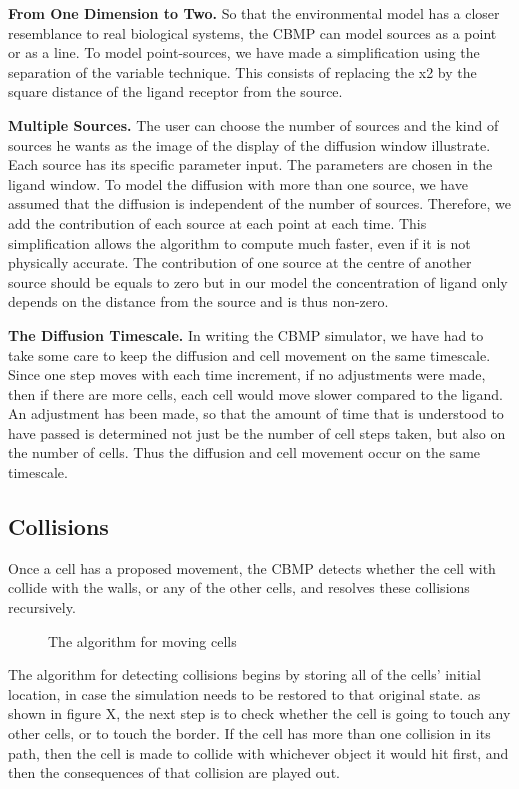 \documentclass[12pt]{article}
\begin{document}
{\bfseries From One Dimension to Two.}
So that the environmental model has a closer resemblance to real 
biological systems, the CBMP can model sources as a point or as a line. 
To model point-sources, we have made a simplification using the 
separation of the variable technique. This consists of replacing the x2 
by the square distance of the ligand receptor from the source.

{\bfseries Multiple Sources.}
The user can choose the number of sources and the kind of sources he 
wants as the image of the display of the diffusion window illustrate. 
Each source has its specific parameter input. The parameters are chosen 
in the ligand window. To model the diffusion with more than one source, 
we have assumed that the diffusion is independent of the number of 
sources. Therefore, we add the contribution of each source at each point 
at each time. This simplification allows the algorithm to compute much 
faster, even if it is not physically accurate. The contribution of one 
source at the centre of another source should be equals to zero but in 
our model the concentration of ligand only depends on the distance from 
the source and is thus non-zero. 

{\bfseries The Diffusion Timescale.}
In writing the CBMP simulator, we have had to take some care to keep the 
diffusion and cell movement on the same timescale. Since one step moves 
with each time increment, if no adjustments were made, then if there are 
more cells, each cell would move slower compared to the ligand. An 
adjustment has been made, so that the amount of time that is understood 
to have passed is determined not just be the number of cell steps taken, 
but also on the number of cells. Thus the diffusion and cell movement 
occur on the same timescale.

\subsection{Collisions}
  Once a cell has a proposed movement, the CBMP 
detects whether the cell with collide with the walls, or any of the 
other cells, and resolves these collisions recursively.

\begin{figure}[H]
\centering
\caption{The algorithm for moving cells}
\end{figure}

The algorithm for detecting collisions begins by storing all of the 
cells' initial location, in case the simulation needs to be restored to 
that original state. as shown in figure X, the next step is to check 
whether the cell is going to touch any other cells, or to touch the 
border. If the cell has more than one collision in its path, then the 
cell is made to collide with whichever object it would hit first, and 
then the consequences of that collision are played out. 
\end{document}
